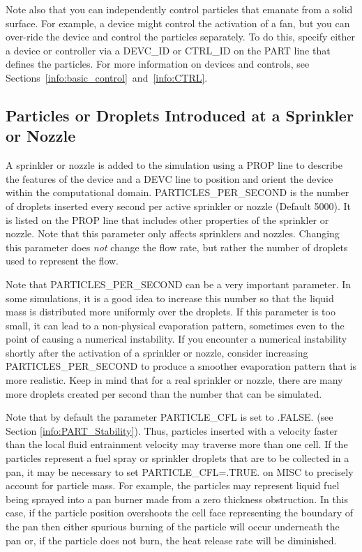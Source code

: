 \documentclass[11pt]{book}
\begin{document}
Note also that you can independently control particles that emanate from a solid surface. For example, a device might control the activation of a fan, but you can over-ride the device and control the particles separately. To do this, specify either a device or controller via a {\ct DEVC\_ID} or {\ct CTRL\_ID} on the {\ct PART} line that defines the particles. For more information on devices and controls, see Sections~\ref{info:basic_control}~and~\ref{info:CTRL}.


\subsection{Particles or Droplets Introduced at a Sprinkler or Nozzle}
\label{info:sprinkler_droplets}

A sprinkler or nozzle is added to the simulation using a {\ct PROP} line to describe the features of the device and a {\ct DEVC} line to position and orient the device within the computational domain. {\ct PARTICLES\_PER\_SECOND} is the  number of droplets inserted every second per active sprinkler or nozzle (Default 5000). It is listed on the {\ct PROP} line that includes other properties of the sprinkler or nozzle. Note that this parameter only affects sprinklers and nozzles. Changing this parameter does {\em not} change the flow rate, but rather the number of droplets used to represent the flow.

Note that {\ct PARTICLES\_PER\_SECOND} can be a very important parameter. In some simulations, it is a good idea to increase this number so that the liquid mass is distributed more uniformly over the droplets. If this parameter is too small, it can lead to a non-physical evaporation pattern, sometimes even to the point of causing a numerical instability. If you encounter a numerical instability shortly after the activation of a sprinkler or nozzle, consider increasing {\ct PARTICLES\_PER\_SECOND} to produce a smoother evaporation pattern that is more realistic. Keep in mind that for a real sprinkler or nozzle, there are many more droplets created per second than the number that can be simulated.

Note that by default the parameter {\ct PARTICLE\_CFL} is set to {\ct .FALSE.} (see Section \ref{info:PART_Stability}).  Thus, particles inserted with a velocity faster than the local fluid entrainment velocity may traverse more than one cell.  If the particles represent a fuel spray or sprinkler droplets that are to be collected in a pan, it may be necessary to set {\ct PARTICLE\_CFL=.TRUE.} on {\ct MISC} to precisely account for particle mass.  For example, the particles may represent liquid fuel being sprayed into a pan burner made from a zero thickness obstruction.  In this case, if the particle position overshoots the cell face representing the boundary of the pan then either spurious burning of the particle will occur underneath the pan or, if the particle does not burn, the heat release rate will be diminished.
\end{document}
